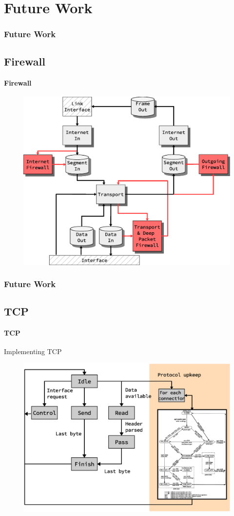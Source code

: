 \section{Future Work}
\begin{frame}
\frametitle{Future Work}
\subsection{Firewall}
\framesubtitle{Firewall}
\begin{figure}
\centering
\includegraphics[scale=0.30]{../thesis/future_work/firewall_integration_design.eps}
\end{figure}
\end{frame}


\begin{frame}
\frametitle{Future Work}
\subsection{TCP}
\framesubtitle{TCP}
Implementing TCP
	\begin{figure}
\includegraphics[scale=0.30]{./future_work/transport_fsm.eps}
	\end{figure}
\end{frame}


